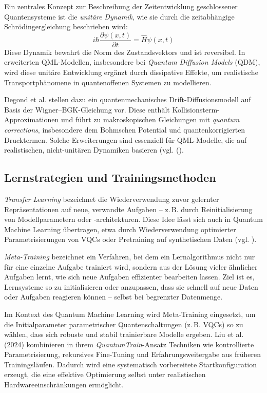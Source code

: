 Ein zentrales Konzept zur Beschreibung der Zeitentwicklung geschlossener Quantensysteme ist die \textit{unitäre Dynamik}, wie sie durch die zeitabhängige Schrödingergleichung beschrieben wird:
\[
i\hbar \frac{\partial \psi(x, t)}{\partial t} = \hat{H} \psi(x, t)
\]
Diese Dynamik bewahrt die Norm des Zustandsvektors und ist reversibel. In erweiterten QML-Modellen, insbesondere bei \textit{Quantum Diffusion Models} (QDM), wird diese unitäre Entwicklung ergänzt durch dissipative Effekte, um realistische Transportphänomene in quantenoffenen Systemen zu modellieren. 

Degond et al. stellen dazu ein quantenmechanisches Drift-Diffusionsmodell auf Basis der Wigner–BGK-Gleichung vor. Diese enthält Kollisionsterm-Approximationen und führt zu makroskopischen Gleichungen mit \textit{quantum corrections}, insbesondere dem Bohmschen Potential und quantenkorrigierten Drucktermen. Solche Erweiterungen sind essenziell für QML-Modelle, die auf realistischen, nicht-unitären Dynamiken basieren (vgl. (\cite{degond_quantum_2005}).


\subsection{Lernstrategien und Trainingsmethoden}  
\textit{Transfer Learning} bezeichnet die Wiederverwendung zuvor gelernter Repräsentationen auf neue, verwandte Aufgaben – z.\,B. durch Reinitialisierung von Modellparametern oder -architekturen. Diese Idee lässt sich auch in Quantum Machine Learning übertragen, etwa durch Wiederverwendung optimierter Parametrisierungen von VQCs oder Pretraining auf synthetischen Daten (vgl. \cite{liuQuantumTrainRethinkingHybrid2024}).
\vspace{0.3cm}

\textit{Meta-Training} bezeichnet ein Verfahren, bei dem ein Lernalgorithmus nicht nur für eine einzelne Aufgabe trainiert wird, sondern aus der Lösung vieler ähnlicher Aufgaben lernt, wie sich neue Aufgaben effizienter bearbeiten lassen. Ziel ist es, Lernsysteme so zu initialisieren oder anzupassen, dass sie schnell auf neue Daten oder Aufgaben reagieren können – selbst bei begrenzter Datenmenge.

Im Kontext des Quantum Machine Learning wird Meta-Training eingesetzt, um die Initialparameter parametrischer Quantenschaltungen (z.\,B. VQCs) so zu wählen, dass sich robuste und stabil trainierbare Modelle ergeben. Liu et al. (2024) kombinieren in ihrem \textit{QuantumTrain}-Ansatz Techniken wie kontrollierte Parametrisierung, rekursives Fine-Tuning und Erfahrungsweitergabe aus früheren Trainingsläufen. Dadurch wird eine systematisch vorbereitete Startkonfiguration erzeugt, die eine effektive Optimierung selbst unter realistischen Hardwareeinschränkungen ermöglicht.


